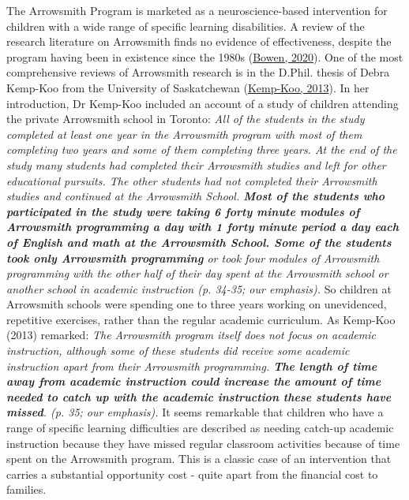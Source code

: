 \documentclass{krantz}
\begin{document}
\begin{tcolorbox}[colback=Black!5!lightgray,colframe=black!75!black,coltitle=white,title=The Arrowsmith Program]\label{box:Arrowsmith}
The Arrowsmith Program is marketed as a neuroscience-based intervention for children with a wide range of specific learning disabilities. A review of the research literature on Arrowsmith finds no evidence of effectiveness, despite the program having been in existence since the 1980s (\protect\hyperlink{ref-bowen2020}{Bowen, 2020}). One of the most comprehensive reviews of Arrowsmith research is in the D.Phil. thesis of Debra Kemp-Koo from the University of Saskatchewan (\protect\hyperlink{ref-kemp-koo2013}{Kemp-Koo, 2013}). In her introduction, Dr Kemp-Koo included an account of a study of children attending the private Arrowsmith school in Toronto: \textit{All of the students in the study completed at least one year in the Arrowsmith program with most of them completing two years and some of them completing three years. At the end of the study many students had completed their Arrowsmith studies and left for other educational pursuits. The other students had not completed their Arrowsmith studies and continued at the Arrowsmith School. \textbf{Most of the students who participated in the study were taking 6 forty minute modules of Arrowsmith programming a day with 1 forty minute period a day each of English and math at the Arrowsmith School. Some of the students took only Arrowsmith programming} or took four modules of Arrowsmith programming with the other half of their day spent at the Arrowsmith school or another school in academic instruction (p. 34-35; our emphasis).}
So children at Arrowsmith schools were spending one to three years working on unevidenced, repetitive exercises, rather than the regular academic curriculum. As Kemp-Koo (2013) remarked: \textit{The Arrowsmith program itself does not focus on academic instruction, although some of these students did receive some academic instruction apart from their Arrowsmith programming. \textbf{The length of time away from academic instruction could increase the amount of time needed to catch up with the academic instruction these students have missed}. (p. 35; our emphasis).}  
It seems remarkable that children who have a range of specific learning difficulties are described as needing catch-up academic instruction because they have missed regular classroom activities because of time spent on the Arrowsmith program. This is a classic case of an intervention that carries a substantial opportunity cost - quite apart from the financial cost to families.  
\end{tcolorbox}
\end{document}
